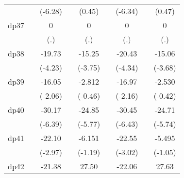 {\begin{tabular}{l*{8}{c}}
            &                     &     (-6.28)         &                     &      (0.45)         &                     &     (-6.34)         &                     &      (0.47)         \\
[1em]
dp37        &                     &           0         &                     &           0         &                     &           0         &                     &           0         \\
            &                     &         (.)         &                     &         (.)         &                     &         (.)         &                     &         (.)         \\
[1em]
dp38        &                     &      -19.73\sym{***}&                     &      -15.25\sym{***}&                     &      -20.43\sym{***}&                     &      -15.06\sym{***}\\
            &                     &     (-4.23)         &                     &     (-3.75)         &                     &     (-4.34)         &                     &     (-3.68)         \\
[1em]
dp39        &                     &      -16.05\sym{*}  &                     &      -2.812         &                     &      -16.97\sym{*}  &                     &      -2.530         \\
            &                     &     (-2.06)         &                     &     (-0.46)         &                     &     (-2.16)         &                     &     (-0.42)         \\
[1em]
dp40        &                     &      -30.17\sym{***}&                     &      -24.85\sym{***}&                     &      -30.45\sym{***}&                     &      -24.71\sym{***}\\
            &                     &     (-6.39)         &                     &     (-5.77)         &                     &     (-6.43)         &                     &     (-5.74)         \\
[1em]
dp41        &                     &      -22.10\sym{**} &                     &      -6.151         &                     &      -22.55\sym{**} &                     &      -5.495         \\
            &                     &     (-2.97)         &                     &     (-1.19)         &                     &     (-3.02)         &                     &     (-1.05)         \\
[1em]
dp42        &                     &      -21.38         &                     &       27.50\sym{*}  &                     &      -22.06         &                     &       27.63\sym{*}  \\

\end{tabular}}
